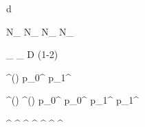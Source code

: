 
\newmathsymbol{\tagdecision}     {d}
\newmathsymbol{\tg}              {\tagdecision}
\newmathsymbol{\mistagestimate}  {\eta}
\newmathsymbol{\mistag}          {\omega}

\newmathsymbol{\Ntagged}         {N_}
\newmathsymbol{\NRtagged}        {N_}
\newmathsymbol{\NWtagged}        {N_}
\newmathsymbol{\NUtagged}        {N_}

\newmathsymbol{\tageff}          {\eps_}
\newmathsymbol{\efftageff}       {\eps_}
\newmathsymbol{\tagdilution}     {D}
\newmathsymbol{\tagdilutionlg}   {(1-2\mistag)}

\newcommand{\p}[2]                {p_{#1}^{#2}}
\newcommand{\deltap}[2]           {\Delta p_{#1}^{#2}}
\newcommand{\omegaofeta}[1]       {\mistag^{#1}(\mistagestimate)}
\newmathsymbol{\omofeta}          {\omegaofeta{}}
\newmathsymbol{\pzero}            {\p{0}{}}
\newmathsymbol{\deltapzero}       {}
\newmathsymbol{\pone}             {\p{1}{}}
\newmathsymbol{\deltapone}        {}
\newmathsymbol{\avgmistagestimate}{\langle\mistagestimate\rangle}

\newmathsymbol{\omofetaBd}        {\omegaofeta{\Bd}}
\newmathsymbol{\omofetaBdbar}     {\omegaofeta{\Bdbar}}
\newmathsymbol{\pzeroBd}          {\p{0}{\Bd}}
\newmathsymbol{\pzeroBdbar}       {\p{0}{\Bdbar}}
\newmathsymbol{\poneBd}           {\p{1}{\Bd}}
\newmathsymbol{\poneBdbar}        {\p{1}{\Bdbar}}

\newmathsymbol{\tgos}        {\tagdecision^}
\newmathsymbol{\mistagestos} {\mistagestimate^}
\newmathsymbol{\mistagos}    {\mistag^}
\newmathsymbol{\pzeroos}     {\pzero^}
\newmathsymbol{\pzeroosll}   {\pzero^}
\newmathsymbol{\pzeroosdd}   {\pzero^}
\newmathsymbol{\poneos}      {\pone^}
\newmathsymbol{\avgmistagestos}{\langle\mistagestos\rangle}
\newmathsymbol{\avgmistagestosll}{\langle\mistagestosll\rangle}
\newmathsymbol{\avgmistagestosdd}{\langle\mistagestosdd\rangle}


